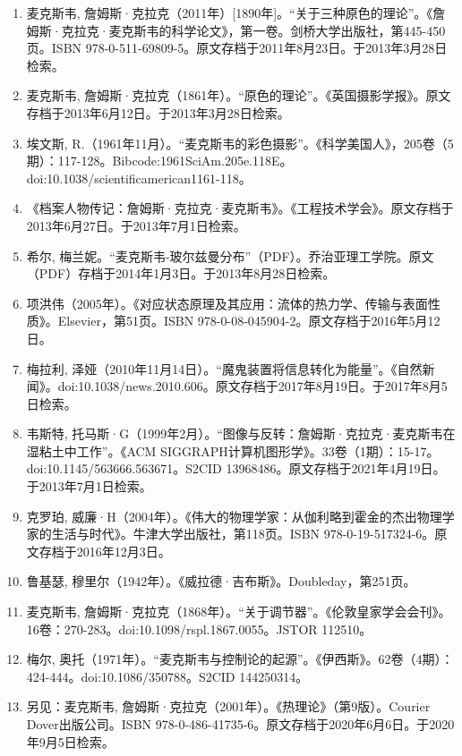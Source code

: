 \begin{enumerate}
\item 麦克斯韦, 詹姆斯·克拉克（2011年）[1890年]。“关于三种原色的理论”。《詹姆斯·克拉克·麦克斯韦的科学论文》，第一卷。剑桥大学出版社，第445-450页。ISBN 978-0-511-69809-5。原文存档于2011年8月23日。于2013年3月28日检索。  
\item 麦克斯韦, 詹姆斯·克拉克（1861年）。“原色的理论”。《英国摄影学报》。原文存档于2013年6月12日。于2013年3月28日检索。  
\item 埃文斯, R.（1961年11月）。“麦克斯韦的彩色摄影”。《科学美国人》，205卷（5期）：117-128。Bibcode:1961SciAm.205e.118E。doi:10.1038/scientificamerican1161-118。  
\item 《档案人物传记：詹姆斯·克拉克·麦克斯韦》。《工程技术学会》。原文存档于2013年6月27日。于2013年7月1日检索。  
\item 希尔, 梅兰妮。“麦克斯韦-玻尔兹曼分布”（PDF）。乔治亚理工学院。原文（PDF）存档于2014年1月3日。于2013年8月28日检索。  
\item 项洪伟（2005年）。《对应状态原理及其应用：流体的热力学、传输与表面性质》。Elsevier，第51页。ISBN 978-0-08-045904-2。原文存档于2016年5月12日。
\item 梅拉利, 泽娅（2010年11月14日）。“魔鬼装置将信息转化为能量”。《自然新闻》。doi:10.1038/news.2010.606。原文存档于2017年8月19日。于2017年8月5日检索。  
\item 韦斯特, 托马斯·G（1999年2月）。“图像与反转：詹姆斯·克拉克·麦克斯韦在湿粘土中工作”。《ACM SIGGRAPH计算机图形学》。33卷（1期）：15-17。doi:10.1145/563666.563671。S2CID 13968486。原文存档于2021年4月19日。于2013年7月1日检索。  
\item 克罗珀, 威廉·H（2004年）。《伟大的物理学家：从伽利略到霍金的杰出物理学家的生活与时代》。牛津大学出版社，第118页。ISBN 978-0-19-517324-6。原文存档于2016年12月3日。  
\item 鲁基瑟, 穆里尔（1942年）。《威拉德·吉布斯》。Doubleday，第251页。  
\item 麦克斯韦, 詹姆斯·克拉克（1868年）。“关于调节器”。《伦敦皇家学会会刊》。16卷：270-283。doi:10.1098/rspl.1867.0055。JSTOR 112510。  
\item 梅尔, 奥托（1971年）。“麦克斯韦与控制论的起源”。《伊西斯》。62卷（4期）：424-444。doi:10.1086/350788。S2CID 144250314。  
\item 另见：麦克斯韦, 詹姆斯·克拉克（2001年）。《热理论》（第9版）。Courier Dover出版公司。ISBN 978-0-486-41735-6。原文存档于2020年6月6日。于2020年9月5日检索。
\end{enumerate}